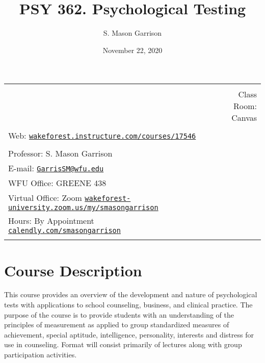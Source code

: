 \documentclass[11pt,]{article}
\title{PSY 362. Psychological Testing}
\author{S. Mason Garrison}
\date{November 22, 2020}
\begin{document}
		\maketitle
	

		\thispagestyle{firststyle}



\noindent \begin{tabular*}{\textwidth}{ @{\extracolsep{\fill}} lr @{\extracolsep{\fill}}}
\hline\\
    &  Class Room: Canvas
%
\\\hline\\
%
 Web: \href{https://wakeforest.instructure.com/courses/17546}{\tt wakeforest.instructure.com/courses/17546}&  \\ %
&  \\
Professor: S. Mason Garrison \\

E-mail: \texttt{\href{mailto:GarrisSM@wfu.edu}{\nolinkurl{GarrisSM@wfu.edu}}}  \\

WFU Office: GREENE 438   \\
Virtual Office: Zoom
\href{https://wakeforest-university.zoom.us/my/smasongarrison}{\tiny\tt wakeforest-university.zoom.us/my/smasongarrison}   \\
Hours: By Appointment
\href{https://calendly.com/smasongarrison/}{\small\tt calendly.com/smasongarrison}  \\


	&  \\
	\hline
\end{tabular*}

\vspace{2mm}

\section{Course Description}\label{course-description}

This course provides an overview of the development and nature of
psychological tests with applications to school counseling, business,
and clinical practice. The purpose of the course is to provide students
with an understanding of the principles of measurement as applied to
group standardized measures of achievement, special aptitude,
intelligence, personality, interests and distress for use in counseling.
Format will consist primarily of lectures along with group participation
activities.
\end{document}
